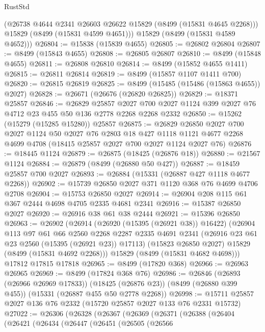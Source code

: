\begin{lexlean}{RustStd}
\begin{coremodule}
        (@26738 @4644 @2341 @26603 @26622 @15829 (@8499 (@15831 @4645 @2268)))
        @15829
        (@8499 (@15831 @4599 @4651)))
      @15829
      (@8499 (@15831 @4589 @4652)))
@26804 := @15838 (@15839 @4655)
@26805 := @26802 @26804
@26807 := @8499 (@15843 @4655)
@26808 := @26805 @26807
@26810 := @8499 (@15848 @4655)
@26811 := @26808 @26810
@26814 := @8499 (@15852 @4655 @1411)
@26815 := @26811 @26814
@26819 := @8499 (@15857 @1107 @1411 @700)
@26820 := @26815 @26819
@26825 := @8499 (@15485 (@15486 (@15863 @4655)) @2027)
@26828 := @26671 (@26676 (@26820 @26825))
@26829 := @18371 @25857
@26846 := @26829
    @25857
    @2027
    @700
    @2027
    @1124
    @399
    @2027
    @76
    @4712
    @23
    @455
    @50
    @136
    @2778
    @2268
    @2268
    @2332
@26850 := @15262 (@15279 (@15285 @15280)) @25857
@26875 := @26829
    @26850
    @2027
    @700
    @2027
    @1124
    @50
    @2027
    @76
    @2803
    @18
    @427
    @1118
    @1121
    @4677
    @2268
    @4699
    @4708
    (@18415 @25857 @2027 @700 @2027 @1124 @2027 @76)
@26876 := @18445 @1124
@26879 := @26875 (@18425 (@26876 @18))
@26880 := @21567 @1124
@26884 := @26879 (@8499 (@26880 @50 @427))
@26887 := @18459 @25857 @700 @2027
@26893 := @26884 (@15331 (@26887 @427 @1118 @4677 @2268))
@26902 := @15739 @26850 @2027 @371 @1120 @368 @76 @4699 @4706 @2708
@26904 := @15753 @26850 @2027
@26914 := @26904 @208 @115 @61 @367 @2444 @4698 @4705 @2335 @4681 @2341
@26916 := @15387 @26850 @2027
@26920 := @26916 @38 @61 @38 @2444
@26921 := @15396 @26850
@26963 := @26902
    (@26914
      (@26920 (@15395 (@26921 @38)) @16422)
      (@26904
        @113
        @97
        @61
        @66
        @2560
        @2268
        @2287
        @2335
        @4691
        @2341
        (@26916 @23 @61 @23 @2560 (@15395 (@26921 @23)) @17113)
        (@15823 @26850 @2027)
        @15829
        (@8499 (@15831 @4692 @2268)))
      @15829
      (@8499 (@15831 @4682 @4698)))
    @17812
    @17815
    @17818
@26965 := @8499 (@17820 @368)
@26966 := @26963 @26965
@26969 := @8499 (@17824 @368 @76)
@26986 := @26846
    (@26893 (@26966 @26969 @17833))
    (@18425 (@26876 @23))
    (@8499 (@26880 @399 @455))
    (@15331 (@26887 @455 @50 @2778 @2268))
@26998 := @15711 @25857 @2027 @136 @76 @2332 (@15720 @25857 @2027 @133 @76 @2331 @15732)
@27022 := @26306
    (@26328
      (@26367
        (@26369
          (@26371
            (@26388
              (@26404
                (@26421
                  (@26434
                    (@26447
                      (@26451
                        (@26505
                          (@26566

\end{coremodule}
\end{lexlean}
